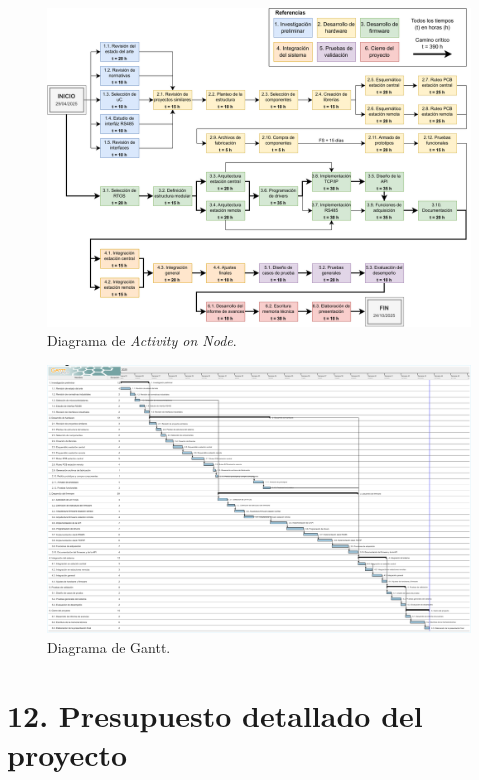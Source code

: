 \documentclass[
11pt, %
]{charter}
\begin{document}
\begin{landscape}
	\begin{figure}[htpb]
		\centering 
		\includegraphics[height=\textheight]{./Figuras/diagAoN.pdf}
		\caption{Diagrama de \textit{Activity on Node}.}
		\label{fig:diagAoN}
	\end{figure}
\end{landscape}

\begin{landscape}
\begin{figure}[htpb]
\centering 
\includegraphics[height=\textheight]{./Figuras/diagGantt.pdf}
\caption{Diagrama de Gantt.}
\label{fig:diagGantt}
\end{figure}

\end{landscape}


\section{12. Presupuesto detallado del proyecto}
\label{sec:presupuesto}
\end{document}

